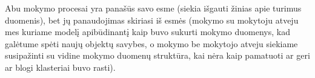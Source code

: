 Abu mokymo procesai yra panašūs savo esme (siekia išgauti žinias apie turimus
duomenis), bet jų panaudojimas skiriasi iš esmės (mokymo su mokytoju atveju mes
kuriame modelį apibūdinantį kaip buvo sukurti mokymo duomenys, kad galėtume
spėti naujų objektų savybes, o mokymo be mokytojo atveju siekiame susipažinti
su vidine mokymo duomenų struktūra, kai nėra kaip pamatuoti ar geri ar blogi
klasteriai buvo rasti).




